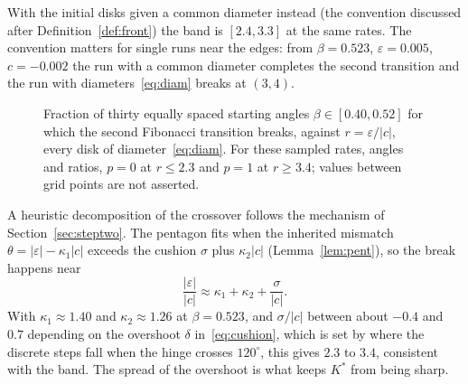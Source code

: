 \documentclass[11pt]{amsart}
\theoremstyle{definition}
\newcommand{\eps}{\varepsilon}
\begin{document}
With the initial disks given a common diameter instead (the convention discussed after
Definition~\ref{def:front}) the band is $[2.4,3.3]$ at the same rates. The convention matters for single runs
near the edges: from $\beta=0.523$, $\eps=0.005$, $c=-0.002$ the run with a common diameter completes the
second transition and the run with diameters~\eqref{eq:diam} breaks at $(3,4)$.

\begin{figure}[t]
\centering
{}
\caption{Fraction of thirty equally spaced starting angles $\beta\in[0.40,0.52]$ for which the second
Fibonacci transition breaks, against $r=\eps/|c|$, every disk of diameter~\eqref{eq:diam}. For these sampled rates, angles and ratios, $p=0$ at $r\le2.3$ and $p=1$ at
$r\ge3.4$; values between grid points are not asserted.}\label{fig:pr}
\end{figure}

A heuristic decomposition of the crossover follows the mechanism of Section~\ref{sec:steptwo}. The pentagon fits when the
inherited mismatch $\theta=|\eps|-\kappa_1|c|$ exceeds the cushion $\sigma$ plus $\kappa_2|c|$ (Lemma~\ref{lem:pent}),
so the break happens near
\[
\frac{|\eps|}{|c|}\approx\kappa_1+\kappa_2+\frac{\sigma}{|c|}.
\]
With $\kappa_1\approx1.40$ and $\kappa_2\approx1.26$ at $\beta=0.523$, and $\sigma/|c|$ between about $-0.4$
and $0.7$ depending on the overshoot $\delta$ in~\eqref{eq:cushion}, which is set by where the discrete steps
fall when the hinge crosses $120^\circ$, this gives $2.3$ to $3.4$, consistent with the band. The spread
of the overshoot is what keeps $K^*$ from being sharp.
\end{document}
